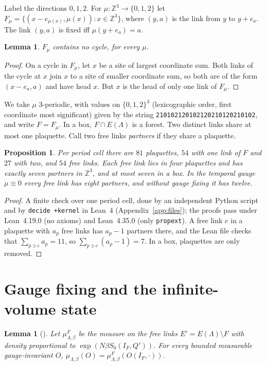 \documentclass[11pt]{amsart}
\newtheorem{proposition}[theorem]{Proposition}
\newtheorem{lemma}[theorem]{Lemma}
\theoremstyle{definition}
\theoremstyle{remark}
\newcommand{\Z}{\mathbb{Z}}
\begin{document}
Label the directions $0,1,2$. For $\mu:\Z^3\to\{0,1,2\}$ let $F_\mu=\{(x-e_{\mu(x)},\mu(x)):x\in\Z^3\}$, where
$(y,a)$ is the link from $y$ to $y+e_a$. The link $(y,a)$ is fixed iff $\mu(y+e_a)=a$.

\begin{lemma}
$F_\mu$ contains no cycle, for every $\mu$.
\end{lemma}

\begin{proof}
On a cycle in $F_\mu$, let $x$ be a site of largest coordinate sum. Both links of the cycle at $x$ join $x$ to a
site of smaller coordinate sum, so both are of the form $(x-e_a,a)$ and have head $x$. But $x$ is the head of only
one link of $F_\mu$.
\end{proof}

We take $\mu$ $3$-periodic, with values on $\{0,1,2\}^3$ (lexicographic order, first coordinate most significant)
given by the string \texttt{210102120102120210120210102}, and write $F=F_\mu$. In a box, $F\cap E(\Lambda)$ is a
forest. Two distinct links share at most one plaquette. Call two free links \emph{partners} if they share a
plaquette.

\begin{proposition}\label{prop:counts}
Per period cell there are $81$ plaquettes, $54$ with one link of $F$ and $27$ with two, and $54$ free links. Each
free link lies in four plaquettes and has exactly seven partners in $\Z^3$, and at most seven in a box. In the
temporal gauge $\mu\equiv0$ every free link has eight partners, and without gauge fixing it has twelve.
\end{proposition}

\begin{proof}
A finite check over one period cell, done by an independent Python script and by \texttt{decide~+kernel} in Lean~4
(Appendix~\ref{app:files}); the proofs pass under Lean~4.19.0 (no axioms) and Lean~4.35.0 (only \texttt{propext}). A free link $e$ in a plaquette with
$a_p$ free links has $a_p-1$ partners there, and the Lean file checks that $\sum_{p\ni e}a_p=11$, so
$\sum_{p\ni e}(a_p-1)=7$. In a box, plaquettes are only removed.
\end{proof}

\section{Gauge fixing and the infinite-volume state}\label{sec:state}

\begin{lemma}[\cite{BBL,R}]\label{lem:gauge}
Let $\mu^F_{\Lambda,\beta}$ be the measure on the free links $E'=E(\Lambda)\setminus F$ with density proportional to
$\exp(N\beta S_0(I_F,Q'))$. For every bounded measurable gauge-invariant $O$,
$\mu_{\Lambda,\beta}(O)=\mu^F_{\Lambda,\beta}(O(I_F,\cdot))$.
\end{lemma}
\end{document}
